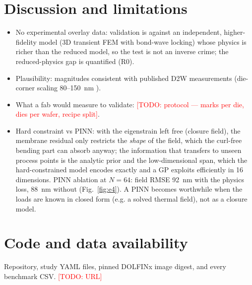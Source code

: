 \documentclass[11pt]{article}
\newcommand{\todo}[1]{\textcolor{red}{[TODO: #1]}}
\begin{document}
\section{Discussion and limitations}\label{sec:discussion}
\begin{itemize}
  \item No experimental overlay data: validation is against an independent, higher-fidelity model (3D transient FEM with
        bond-wave locking) whose physics is richer than the reduced model, so the test is not an inverse crime; the
        reduced-physics gap is quantified (R0).
  \item Plausibility: magnitudes consistent with published D2W measurements (die-corner scaling 80--150~nm \cite{bex2024}).
  \item What a fab would measure to validate: \todo{protocol --- marks per die, dies per wafer, recipe split}.
  \item Hard constraint vs PINN: with the eigenstrain left free (closure field), the membrane residual only
        restricts the \emph{shape} of the field, which the curl-free bending part can absorb anyway; the
        information that transfers to unseen process points is the analytic prior and the low-dimensional span,
        which the hard-constrained model encodes exactly and a GP exploits efficiently in 16 dimensions.
        PINN ablation at $N=64$: field RMSE 92~nm with the physics loss, 88~nm without (Fig.~\ref{fig:e4}).
        A PINN becomes worthwhile when the loads are known in closed form (e.g. a solved thermal field), not as
        a closure model.
\end{itemize}

\section*{Code and data availability}
Repository, study YAML files, pinned DOLFINx image digest, and every benchmark CSV. \todo{URL}



\end{document}
